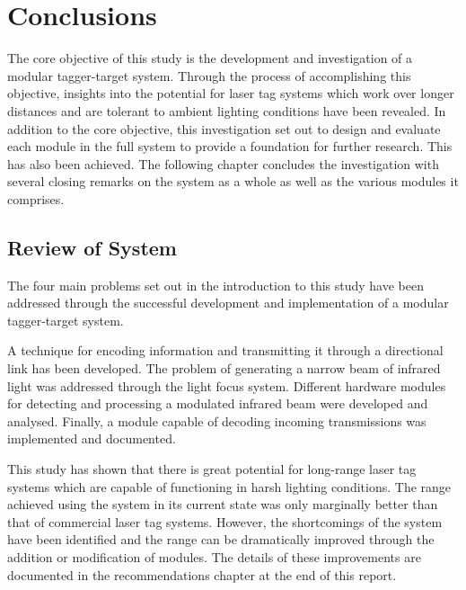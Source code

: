 \chapter{Conclusions}
\label{ch_conclusions}



The core objective of this study is the development and investigation of a modular tagger-target system. Through the process of accomplishing this objective, insights into the potential for laser tag systems which work over longer distances and are tolerant to ambient lighting conditions have been revealed.
In addition to the core objective, this investigation set out to design and evaluate each module in the full system to provide a foundation for further research. This has also been achieved. The following chapter concludes the investigation with several closing remarks on the system as a whole as well as the various modules it comprises.

\section{Review of System}


The four main problems set out in the introduction to this study have been addressed through the successful development and implementation of a modular tagger-target system.

A technique for encoding information and transmitting it through a directional link has been developed. The problem of generating a narrow beam of infrared light was addressed through the light focus system. Different hardware modules for detecting and processing a modulated infrared beam were developed and analysed. Finally, a module capable of decoding incoming transmissions was implemented and documented.

This study has shown that there is great potential for long-range laser tag systems which are capable of functioning in harsh lighting conditions. The range achieved using the system in its current state was only marginally better than that of commercial laser tag systems. However, the shortcomings of the system have been identified and the range can be dramatically improved through the addition or modification of modules. The details of these improvements are documented in the recommendations chapter at the end of this report.

